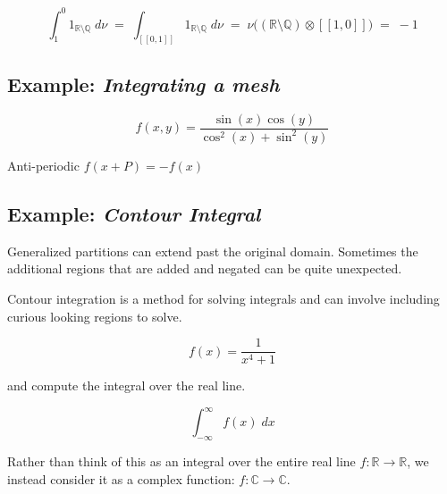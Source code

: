 \begin{equation}
	\int_1^0 1_{\mathbb{R}\setminus \mathbb{Q}} \;d\nu
		\;=\; \int_{[\![0,1]\!]} 1_{\mathbb{R}\setminus \mathbb{Q}} \;d\nu
		\;=\; \nu \big( (\mathbb{R}\setminus\mathbb{Q} ) \otimes [\![1,0]\!] \big)
		\;=\; -1
\end{equation}


\subsection{Example: \emph{Integrating a mesh}}

\begin{equation}
	f(x,y) = \frac{\sin(x) \cos(y)}{\cos^2(x) + \sin^2(y)}
\end{equation}



Anti-periodic $f(x+P) = -f(x)$


\subsection{Example: \emph{Contour Integral}}

Generalized partitions can extend past the original domain. 
Sometimes the additional regions that are added and negated can be quite unexpected.


Contour integration is a method for solving integrals and can involve including curious looking regions to solve.

\begin{equation}
	f(x) = \frac{1}{x^4 + 1}
\end{equation}

and compute the integral over the real line.

\begin{equation}
	 \int_{-\infty}^\infty f(x) \; dx
\end{equation}

Rather than think of this as an integral over the entire real line $f:\mathbb{R} \to \mathbb{R}$, 
we instead consider it as a complex function: $f:\mathbb{C} \to \mathbb{C}$.

